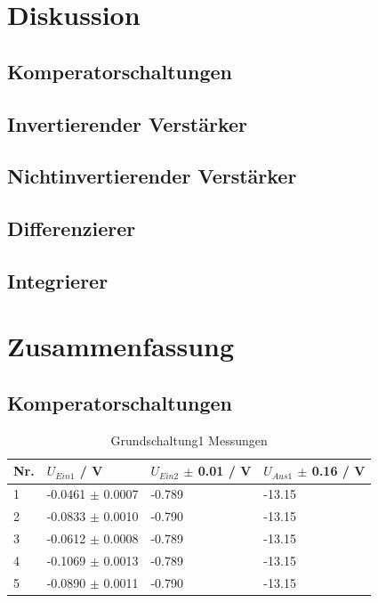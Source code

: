 \documentclass[12pt,a4paper,twoside]{article}
\begin{document}
\section{Diskussion} %

\subsection{Komperatorschaltungen}



\subsection{Invertierender Verstärker}



\subsection{Nichtinvertierender Verstärker}



\subsection{Differenzierer}



\subsection{Integrierer}




\section{Zusammenfassung} %

\subsection{Komperatorschaltungen}

\begin{table}[H]
    \centering
    \caption{Grundschaltung1 Messungen}
    \label{tab:Grundschaltung1MessungenAW}
    \begin{tabular}{| l | l | l | l |}
        \hline
        Nr. & $U_{Ein1}$ / V & $U_{Ein2}$ $\pm$ 0.01 / V & $U_{Aus1}$ $\pm$ 0.16 / V \\
        \hline
        1 & -0.0461 $\pm$ 0.0007 & -0.789 & -13.15 \\
        2 & -0.0833 $\pm$ 0.0010 & -0.790 & -13.15 \\
        3 & -0.0612 $\pm$ 0.0008 & -0.789 & -13.15 \\
        4 & -0.1069 $\pm$ 0.0013 & -0.789 & -13.15 \\
        5 & -0.0890 $\pm$ 0.0011 & -0.790 & -13.15 \\
        \hline
    \end{tabular}
\end{table}
\end{document}
